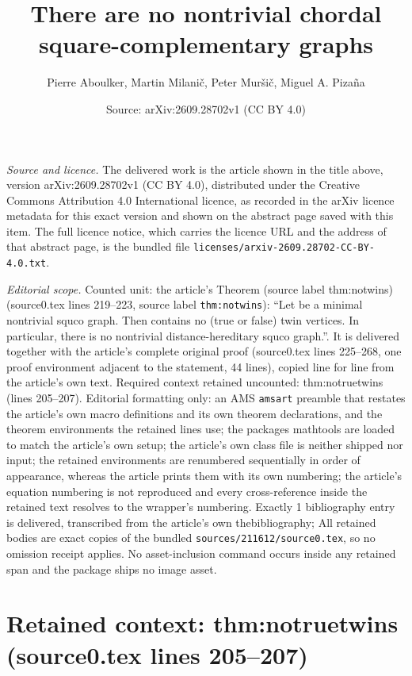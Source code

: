 \documentclass[10pt,a4paper]{amsart}
\title[There are no nontrivial chordal square-complementary graphs]{There are no nontrivial chordal square-complementary graphs}
\author{Pierre Aboulker, Martin Milani\v{c}, Peter Mur\v{s}i\v{c}, Miguel A. Piza\~na}
\date{Source: arXiv:2609.28702v1 (CC BY 4.0)}
\theoremstyle{plain}
\begin{document}
\maketitle

\noindent\emph{Source and licence.} The delivered work is the article shown in the title above, version arXiv:2609.28702v1 (CC BY 4.0), distributed under the Creative Commons Attribution 4.0 International licence, as recorded in the arXiv licence metadata for this exact version and shown on the abstract page saved with this item. The full licence notice, which carries the licence URL and the address of that abstract page, is the bundled file \texttt{licenses/arxiv-2609.28702-CC-BY-4.0.txt}.
\par\smallskip

\noindent\textit{Editorial scope.} Counted unit: the article's Theorem (source label thm:notwins) (source0.tex lines 219--223, source label \texttt{thm:notwins}): ``Let be a minimal nontrivial squco graph. Then contains no (true or false) twin vertices. In particular, there is no nontrivial distance-hereditary squco graph.''. It is delivered together with the article's complete original proof (source0.tex lines 225--268, one proof environment adjacent to the statement, 44 lines), copied line for line from the article's own text. Required context retained uncounted: thm:notruetwins (lines 205--207). Editorial formatting only: an AMS \texttt{amsart} preamble that restates the article's own macro definitions and its own theorem declarations, and the theorem environments the retained lines use; the packages mathtools are loaded to match the article's own setup; the article's own class file is neither shipped nor input; the retained environments are renumbered sequentially in order of appearance, whereas the article prints them with its own numbering; the article's equation numbering is not reproduced and every cross-reference inside the retained text resolves to the wrapper's numbering. Exactly 1 bibliography entry is delivered, transcribed from the article's own thebibliography; All retained bodies are exact copies of the bundled \texttt{sources/211612/source0.tex}, so no omission receipt applies. No asset-inclusion command occurs inside any retained span and the package ships no image asset.


\section*{Retained context: thm:notruetwins (source0.tex lines 205--207)}
\end{document}
